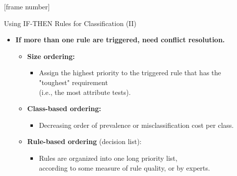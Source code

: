 \documentclass[aspectratio=169,t,table]{beamer}
\begin{document}
  {
    [frame number]
    \begin{frame}{Using \uppercase{if-then} Rules for Classification (II)}
      \begin{itemize}
        \item \textbf{If more than one rule are triggered, need {\color{airforceblue}conflict resolution}.}
        \begin{itemize}
          \item \textbf{\color{airforceblue}Size ordering:}
          \begin{itemize}
            \item Assign the highest priority to the triggered rule that has the "toughest" requirement \\ (i.e., the most attribute tests).
          \end{itemize}
          \item \textbf{\color{airforceblue}Class-based ordering:}
          \begin{itemize}
            \item Decreasing order of prevalence or misclassification cost per class.
          \end{itemize}
        \item \textbf{\color{airforceblue}Rule-based ordering} (decision list):
        \begin{itemize}
          \item Rules are organized into one long priority list,\\
          according to some measure of rule quality, or by experts.
        \end{itemize}
      \end{itemize}
      \end{itemize}
    \end{frame}
  }
\end{document}
